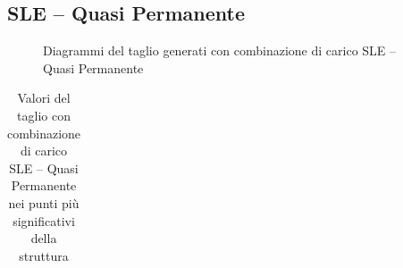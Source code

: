 \begin{landscape}
\subsection*{SLE -- Quasi Permanente}
\begin{figure}[H]
\centering
{} 
\caption{Diagrammi del taglio generati con combinazione di carico SLE -- Quasi Permanente}
\label{fig:Tagli_SLSquasiPermanent}
\end{figure}
\begin{table}[H]
\centering
\caption{Valori del taglio con combinazione di carico SLE -- Quasi Permanente nei punti più significativi della struttura}
	\begin{tabular}{lS[table-format=3.2]S[table-format=3.2]S[table-format=3.2]S[table-format=3.2]S[table-format=3.2]S[table-format=3.2]S[table-format=3.2]S[table-format=3.2]S[table-format=3.2]S[table-format=3.2]S[table-format=3.2]S[table-format=3.2]S[table-format=3.2]}

\end{tabular}
\end{table}
\end{landscape}
